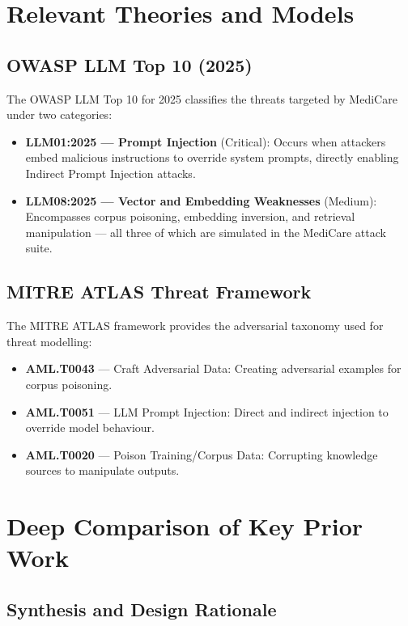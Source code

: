 \section{Relevant Theories and Models}

\subsection{OWASP LLM Top 10 (2025)}
The OWASP LLM Top 10 for 2025 \cite{owasp2025} classifies the threats targeted by MediCare under two categories:
\begin{itemize}
    \item \textbf{LLM01:2025 --- Prompt Injection} (Critical): Occurs when attackers embed malicious instructions to override system prompts, directly enabling Indirect Prompt Injection attacks.
    \item \textbf{LLM08:2025 --- Vector and Embedding Weaknesses} (Medium): Encompasses corpus poisoning, embedding inversion, and retrieval manipulation --- all three of which are simulated in the MediCare attack suite.
\end{itemize}

\subsection{MITRE ATLAS Threat Framework}
The MITRE ATLAS framework \cite{mitreatlas} provides the adversarial taxonomy used for threat modelling:
\begin{itemize}
    \item \textbf{AML.T0043} --- Craft Adversarial Data: Creating adversarial examples for corpus poisoning.
    \item \textbf{AML.T0051} --- LLM Prompt Injection: Direct and indirect injection to override model behaviour.
    \item \textbf{AML.T0020} --- Poison Training/Corpus Data: Corrupting knowledge sources to manipulate outputs.
\end{itemize}
\section{Deep Comparison of Key Prior Work}

\subsection{Synthesis and Design Rationale}

\setlength{\LTleft}{0pt}
\setlength{\LTright}{0pt}

